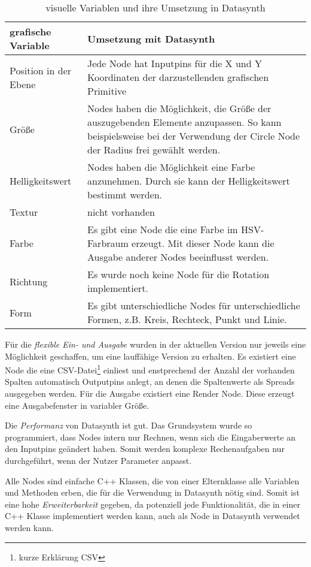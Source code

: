 \documentclass[a4paper, 12pt, DIVcalc, onepage, pdftex, headsepline, footsepline]{scrreprt}
\begin{document}
\begin{table}
\centering
\begin{tabular}{|l|p{9cm}|}
\hline
\textbf{grafische Variable} & \textbf{Umsetzung mit Datasynth}\\
\hline
Position in der Ebene & Jede Node hat Inputpins für die X und Y Koordinaten der darzustellenden grafischen Primitive\\
\hline
Größe & Nodes haben die Möglichkeit, die Größe der auszugebenden Elemente anzupassen.
So kann beispielsweise bei der Verwendung der Circle Node der Radius frei gewählt werden.\\
\hline
Helligkeitswert & Nodes haben die Möglichkeit eine Farbe anzunehmen. Durch sie kann
der Helligkeitswert bestimmt werden.\\
\hline
Textur & nicht vorhanden\\
\hline
Farbe & Es gibt eine Node die eine Farbe im HSV-Farbraum erzeugt. Mit dieser Node kann die Ausgabe
anderer Nodes beeinflusst werden.\\
\hline
Richtung & Es wurde noch keine Node für die Rotation implementiert.\\
\hline
Form & Es gibt unterschiedliche Nodes für unterschiedliche Formen, z.B. Kreis, Rechteck, Punkt und Linie.\\
\hline
\end{tabular}
\caption{visuelle Variablen und ihre Umsetzung in Datasynth}
\label{tab:vars}
\end{table}

Für die \textit{flexible Ein- und Ausgabe} wurden in der aktuellen
Version nur jeweils eine Möglichkeit geschaffen, um eine lauffähige
Version zu erhalten. Es existiert eine Node die eine CSV-Datei\footnote{kurze
Erklärung CSV} einliest und enstprechend der Anzahl der vorhanden
Spalten automatisch Outputpins anlegt, an denen die Spaltenwerte als
Spreads ausgegeben werden. Für die Ausgabe existiert eine Render Node.
Diese erzeugt eine Ausgabefenster in variabler Größe.

Die \textit{Performanz} von Datasynth ist gut. Das Grundsystem wurde so
programmiert, dass Nodes intern nur Rechnen, wenn sich die Eingaberwerte
an den Inputpins geändert haben. Somit werden komplexe Rechenaufgaben nur
durchgeführt, wenn der Nutzer Parameter anpasst.

Alle Nodes sind einfache C++ Klassen, die von einer Elternklasse
alle Variablen und Methoden erben, die für die Verwendung in Datasynth
nötig sind. Somit ist eine hohe \textit{Erweiterbarkeit} gegeben, da potenziell jede
Funktionalität, die in einer C++ Klasse implementiert werden kann, auch
als Node in Datasynth verwendet werden kann.
\end{document}
